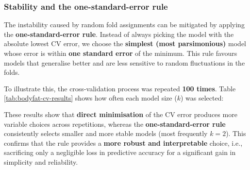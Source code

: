 \documentclass[
  letterpaper,
  DIV=11,
  numbers=noendperiod]{scrartcl}
\begin{document}
\subsubsection{Stability and the one-standard-error
rule}\label{stability-and-the-one-standard-error-rule}

The instability caused by random fold assignments can be mitigated by
applying the \textbf{one-standard-error rule}. Instead of always picking
the model with the absolute lowest CV error, we choose the
\textbf{simplest (most parsimonious)} model whose error is within
\textbf{one standard error} of the minimum. This rule favours models
that generalise better and are less sensitive to random fluctuations in
the folds.

To illustrate this, the cross-validation process was repeated
\textbf{100 times}. Table \ref{tab:bodyfat-cv-results} shows how often
each model size (\(k\)) was selected:

\begin{table}

\caption{\label{tbl-bodyfat-cv-results}}


\end{table}%

These results show that \textbf{direct minimisation} of the CV error
produces more variable choices across repetitions, whereas the
\textbf{one-standard-error rule} consistently selects smaller and more
stable models (most frequently \(k = 2\)). This confirms that the rule
provides a \textbf{more robust and interpretable} choice, i.e.,
sacrificing only a negligible loss in predictive accuracy for a
significant gain in simplicity and reliability.
\end{document}
